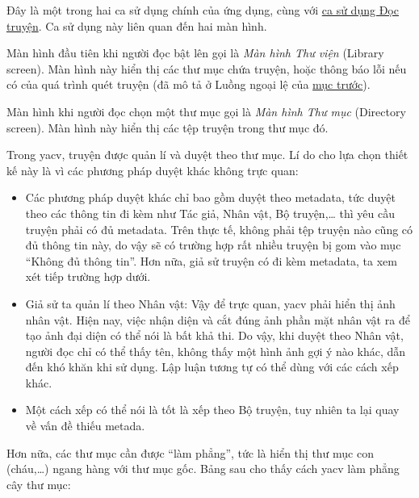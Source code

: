 \documentclass[../../thesis]{subfiles}
\begin{document}
Đây là một trong hai ca sử dụng chính của ứng dụng, cùng với
\hyperref[sec:read-comic]{ca sử dụng Đọc truyện}. Ca sử dụng này liên quan đến
hai màn hình.

Màn hình đầu tiên khi người đọc bật lên gọi là \emph{Màn hình Thư viện} (Library
screen). Màn hình này hiển thị các thư mục chứa truyện, hoặc thông báo lỗi nếu
có của quá trình quét truyện (đã mô tả ở Luồng ngoại lệ của
\hyperref[sec:scan]{mục trước}).

Màn hình khi người đọc chọn một thư mục gọi là \emph{Màn hình Thư mục}
(Directory screen). Màn hình này hiển thị các tệp truyện trong thư mục đó.

Trong yacv, truyện được quản lí và duyệt theo thư mục. Lí do cho lựa chọn thiết
kế này là vì các phương pháp duyệt khác không trực quan:

\begin{itemize}
    \item
        Các phương pháp duyệt khác chỉ bao gồm duyệt theo metadata, tức duyệt
        theo các thông tin đi kèm như Tác giả, Nhân vật, Bộ truyện,\ldots{} thì
        yêu cầu truyện phải có đủ metadata. Trên thực tế, không phải tệp truyện
        nào cũng có đủ thông tin này, do vậy sẽ có trường hợp rất nhiều truyện
        bị gom vào mục ``Không đủ thông tin''. Hơn nữa, giả sử truyện có đi kèm
        metadata, ta xem xét tiếp trường hợp dưới.
    \item
        Giả sử ta quản lí theo Nhân vật: Vậy để trực quan, yacv phải hiển thị
        ảnh nhân vật. Hiện nay, việc nhận diện và cắt đúng ảnh phần mặt nhân vật
        ra để tạo ảnh đại diện có thể nói là bất khả thi. Do vậy, khi duyệt theo
        Nhân vật, người đọc chỉ có thể thấy tên, không thấy một hình ảnh gợi ý
        nào khác, dẫn đến khó khăn khi sử dụng. Lập luận tương tự có thể dùng
        với các cách xếp khác.
    \item
        Một cách xếp có thể nói là tốt là xếp theo Bộ truyện, tuy nhiên ta lại
        quay về vấn đề thiếu metada.
\end{itemize}

Hơn nữa, các thư mục cần được ``làm phẳng'', tức là hiển thị thư mục con
(cháu,\ldots) ngang hàng với thư mục gốc. Bảng sau cho thấy cách yacv làm phẳng
cây thư mục:

\end{document}
